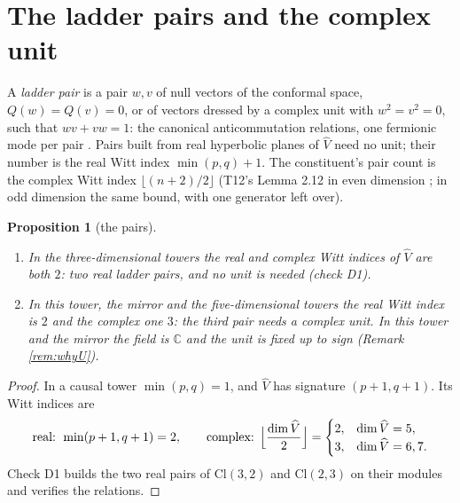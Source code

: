 \documentclass[11pt]{article}
\newtheorem{proposition}[theorem]{Proposition}
\theoremstyle{definition}
\newcommand{\Cl}{\mathrm{Cl}}
\newcommand{\C}{\mathbb{C}}
\newcommand{\hatV}{\widehat{V}}
\begin{document}
\section{The ladder pairs and the complex unit}\label{sec:pairs}

A \emph{ladder pair} is a pair $w, v$ of null vectors of the conformal space, $Q(w) = Q(v) = 0$, or of vectors dressed by a complex unit with $w^{2} = v^{2} = 0$, such that $wv + vw = 1$: the canonical anticommutation relations, one fermionic mode per pair \cite[Prop.~4.1]{ButlerT3}. Pairs built from real hyperbolic planes of $\hatV$ need no unit; their number is the real Witt index $\min(p,q) + 1$. The constituent's pair count is the complex Witt index $\lfloor (n+2)/2 \rfloor$ (T12's Lemma 2.12 in even dimension \cite[Lem.~2.12]{ButlerT12}; in odd dimension the same bound, with one generator left over).

\begin{proposition}[the pairs]\label{prop:pairs}
\begin{enumerate}
\item[(i)] In the three-dimensional towers the real and complex Witt indices of $\hatV$ are both $2$: two real ladder pairs, and no unit is needed (check D1).
\item[(ii)] In this tower, the mirror and the five-dimensional towers the real Witt index is $2$ and the complex one $3$: the third pair needs a complex unit. In this tower and the mirror the field is $\C$ and the unit is fixed up to sign (Remark \ref{rem:whyU}).
\end{enumerate}
\end{proposition}

\begin{proof}
In a causal tower $\min(p,q) = 1$, and $\hatV$ has signature $(p+1, q+1)$. Its Witt indices are
\[
\text{real: } \min(p+1, q+1) = 2, \qquad
\text{complex: } \Bigl\lfloor \frac{\dim\hatV}{2} \Bigr\rfloor =
\begin{cases} 2, & \dim\hatV = 5, \\ 3, & \dim\hatV = 6, 7. \end{cases}
\]
Check D1 builds the two real pairs of $\Cl(3,2)$ and $\Cl(2,3)$ on their modules and verifies the relations.
\end{proof}
\end{document}
